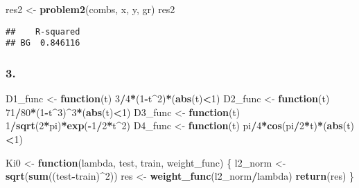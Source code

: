 \documentclass[
]{article}
\newenvironment{Shaded}{\begin{snugshade}}{\end{snugshade}}
\newcommand{\ControlFlowTok}[1]{\textcolor[rgb]{0.13,0.29,0.53}{\textbf{#1}}}
\newcommand{\DecValTok}[1]{\textcolor[rgb]{0.00,0.00,0.81}{#1}}
\newcommand{\FunctionTok}[1]{\textcolor[rgb]{0.13,0.29,0.53}{\textbf{#1}}}
\newcommand{\NormalTok}[1]{#1}
\newcommand{\OtherTok}[1]{\textcolor[rgb]{0.56,0.35,0.01}{#1}}
\newcommand{\SpecialCharTok}[1]{\textcolor[rgb]{0.81,0.36,0.00}{\textbf{#1}}}
\begin{document}
\begin{Shaded}
\begin{Highlighting}[]
\NormalTok{res2 }\OtherTok{\textless{}{-}} \FunctionTok{problem2}\NormalTok{(combs, x, y, gr)}
\NormalTok{res2}
\end{Highlighting}
\end{Shaded}

\begin{verbatim}
##    R-squared
## BG  0.846116
\end{verbatim}

\subsubsection{3.}\label{section-2}

\begin{Shaded}
\begin{Highlighting}[]
\NormalTok{D1\_func }\OtherTok{\textless{}{-}} \ControlFlowTok{function}\NormalTok{(t) }\DecValTok{3}\SpecialCharTok{/}\DecValTok{4}\SpecialCharTok{*}\NormalTok{(}\DecValTok{1}\SpecialCharTok{{-}}\NormalTok{t}\SpecialCharTok{\^{}}\DecValTok{2}\NormalTok{)}\SpecialCharTok{*}\NormalTok{(}\FunctionTok{abs}\NormalTok{(t)}\SpecialCharTok{\textless{}}\DecValTok{1}\NormalTok{)}
\NormalTok{D2\_func }\OtherTok{\textless{}{-}} \ControlFlowTok{function}\NormalTok{(t) }\DecValTok{71}\SpecialCharTok{/}\DecValTok{80}\SpecialCharTok{*}\NormalTok{(}\DecValTok{1}\SpecialCharTok{{-}}\NormalTok{t}\SpecialCharTok{\^{}}\DecValTok{3}\NormalTok{)}\SpecialCharTok{\^{}}\DecValTok{3}\SpecialCharTok{*}\NormalTok{(}\FunctionTok{abs}\NormalTok{(t)}\SpecialCharTok{\textless{}}\DecValTok{1}\NormalTok{)}
\NormalTok{D3\_func }\OtherTok{\textless{}{-}} \ControlFlowTok{function}\NormalTok{(t) }\DecValTok{1}\SpecialCharTok{/}\FunctionTok{sqrt}\NormalTok{(}\DecValTok{2}\SpecialCharTok{*}\NormalTok{pi)}\SpecialCharTok{*}\FunctionTok{exp}\NormalTok{(}\SpecialCharTok{{-}}\DecValTok{1}\SpecialCharTok{/}\DecValTok{2}\SpecialCharTok{*}\NormalTok{t}\SpecialCharTok{\^{}}\DecValTok{2}\NormalTok{)}
\NormalTok{D4\_func }\OtherTok{\textless{}{-}} \ControlFlowTok{function}\NormalTok{(t) pi}\SpecialCharTok{/}\DecValTok{4}\SpecialCharTok{*}\FunctionTok{cos}\NormalTok{(pi}\SpecialCharTok{/}\DecValTok{2}\SpecialCharTok{*}\NormalTok{t)}\SpecialCharTok{*}\NormalTok{(}\FunctionTok{abs}\NormalTok{(t)}\SpecialCharTok{\textless{}}\DecValTok{1}\NormalTok{)}

\NormalTok{Ki0 }\OtherTok{\textless{}{-}} \ControlFlowTok{function}\NormalTok{(lambda, test, train, weight\_func) \{}
\NormalTok{  l2\_norm }\OtherTok{\textless{}{-}} \FunctionTok{sqrt}\NormalTok{(}\FunctionTok{sum}\NormalTok{((test}\SpecialCharTok{{-}}\NormalTok{train)}\SpecialCharTok{\^{}}\DecValTok{2}\NormalTok{))}
\NormalTok{  res }\OtherTok{\textless{}{-}} \FunctionTok{weight\_func}\NormalTok{(l2\_norm}\SpecialCharTok{/}\NormalTok{lambda)}
  \FunctionTok{return}\NormalTok{(res)}
\NormalTok{\}}
\end{Highlighting}
\end{Shaded}
\end{document}
